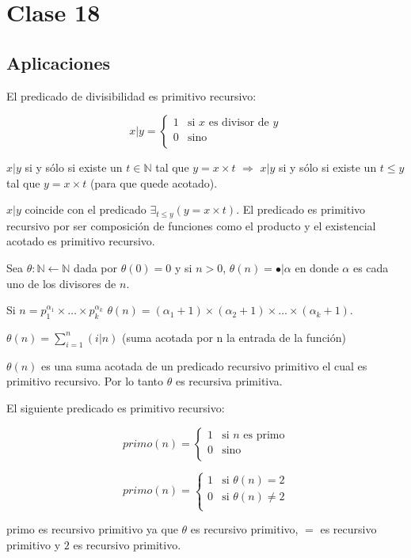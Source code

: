 \section{Clase 18}
 
\subsection{Aplicaciones}
 
\begin{example}
El predicado de divisibilidad es primitivo recursivo:
 
\[
x | y =
\begin{cases}
1			&\text{si $x$ es divisor de $y$}		\\
0			&\text{sino}							\\
\end{cases}
\]
 
$x | y$ si y s\'olo si existe un $t \in \mathbb{N}$ tal que $y = x \times t$ $\Rightarrow$ $x | y$ si y s\'olo si existe un $t \leq y$ tal que $y = x \times t$ (para que quede acotado).
 
$x | y$ coincide con el predicado $\exists_{t \leq y} (y = x \times t)$. El predicado es primitivo recursivo por ser composici\'on de funciones como el producto y el existencial acotado es primitivo recursivo.
\end{example}
 
\begin{example}
Sea $\theta \colon \mathbb{N} \leftarrow \mathbb{N}$ dada por $\theta(0) = 0$ y si $n > 0$, $\theta(n) = \bullet | \alpha$ en donde $\alpha$ es cada uno de los divisores de $n$.
 
Si $n = p_{1}^{\alpha_1} \times \ldots \times p_{k}^{\alpha_k}$ $\theta(n) = (\alpha_1 + 1) \times (\alpha_2 + 1) \times \ldots \times (\alpha_k + 1)$.
 
$\theta(n) = \sum_{i = 1}^{n} (i | n)$ (suma acotada por n la entrada de la funci\'on)
 
$\theta(n)$ es una suma acotada de un predicado recursivo primitivo el cual es primitivo recursivo. Por lo tanto $\theta$ es recursiva primitiva.
 
\end{example}
 
\begin{example}
El siguiente predicado es primitivo recursivo:
 
\[
primo(n) =
\begin{cases}
1			&\text{si $n$ es primo}		\\
0			&\text{sino}				\\
\end{cases}
\]
 
\[
primo(n) =
\begin{cases}
1			&\text{si $\theta(n) = 2$}			\\
0			&\text{si $\theta(n) \neq 2$}		\\
\end{cases}
\]
 
primo es recursivo primitivo ya que $\theta$ es recursivo primitivo, $=$ es recursivo primitivo y $2$ es recursivo primitivo.
\end{example}
 
